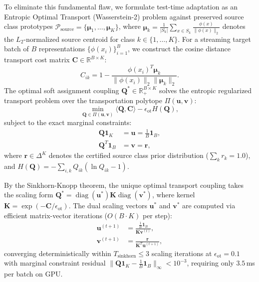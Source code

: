 \documentclass[journal]{IEEEtran}
\begin{document}
To eliminate this fundamental flaw, we formulate test-time adaptation as an Entropic Optimal Transport (Wasserstein-2) problem against preserved source class prototypes $\mathcal{P}_{\text{source}} = \{\boldsymbol{\mu}_1, \dots, \boldsymbol{\mu}_K\}$, where $\boldsymbol{\mu}_k = \frac{1}{|S_k|} \sum_{x \in S_k} \frac{\phi(x)}{\|\phi(x)\|_2}$ denotes the $L_2$-normalized source centroid for class $k \in \{1, \dots, K\}$. For a streaming target batch of $B$ representations $\{\phi(x_i)\}_{i=1}^B$, we construct the cosine distance transport cost matrix $\mathbf{C} \in \mathbb{R}^{B \times K}$:
\begin{equation}
\label{eq:ot_cost}
C_{ik} = 1 - \frac{\phi(x_i)^T \boldsymbol{\mu}_k}{\|\phi(x_i)\|_2 \|\boldsymbol{\mu}_k\|_2}.
\end{equation}
The optimal soft assignment coupling $\mathbf{Q}^* \in \mathbb{R}_+^{B \times K}$ solves the entropic regularized transport problem over the transportation polytope $\Pi(\mathbf{u}, \mathbf{v})$:
\begin{equation}
\label{eq:ot_objective}
\min_{\mathbf{Q} \in \Pi(\mathbf{u}, \mathbf{v})} \langle \mathbf{Q}, \mathbf{C} \rangle - \epsilon_{\text{ot}} H(\mathbf{Q}),
\end{equation}
subject to the exact marginal constraints:
\begin{equation}
\label{eq:ot_marginals}
\begin{aligned}
\mathbf{Q} \mathbf{1}_K &= \mathbf{u} = \frac{1}{B} \mathbf{1}_B, \\
\mathbf{Q}^T \mathbf{1}_B &= \mathbf{v} = \mathbf{r},
\end{aligned}
\end{equation}
where $\mathbf{r} \in \Delta^K$ denotes the certified source class prior distribution ($\sum_k r_k = 1.0$), and $H(\mathbf{Q}) = -\sum_{i, k} Q_{ik} (\ln Q_{ik} - 1)$.

By the Sinkhorn-Knopp theorem, the unique optimal transport coupling takes the scaling form $\mathbf{Q}^* = \operatorname{diag}(\mathbf{u}^*) \mathbf{K} \operatorname{diag}(\mathbf{v}^*)$, where kernel $\mathbf{K} = \exp(-\mathbf{C} / \epsilon_{\text{ot}})$. The dual scaling vectors $\mathbf{u}^*$ and $\mathbf{v}^*$ are computed via efficient matrix-vector iterations ($O(B \cdot K)$ per step):
\begin{equation}
\label{eq:sinkhorn_iters}
\begin{aligned}
\mathbf{u}^{(t+1)} &= \frac{\frac{1}{B} \mathbf{1}_B}{\mathbf{K} \mathbf{v}^{(t)}}, \\
\mathbf{v}^{(t+1)} &= \frac{\mathbf{r}}{\mathbf{K}^T \mathbf{u}^{(t+1)}},
\end{aligned}
\end{equation}
converging deterministically within $T_{\text{sinkhorn}} \le 3$ scaling iterations at $\epsilon_{\text{ot}} = 0.1$ with marginal constraint residual $\|\mathbf{Q} \mathbf{1}_K - \frac{1}{B}\mathbf{1}_B\|_\infty < 10^{-3}$, requiring only $3.5$\,ms per batch on GPU.
\end{document}
